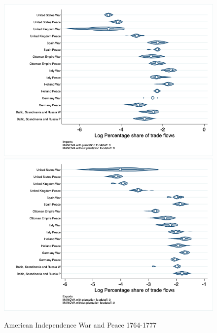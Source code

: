 \documentclass[12pt,a4paper,notitlepage,english]{article}
\begin{document}
\begin{appendix}
\begin{figure}[h!]
\centering
\caption{American Independence War and Peace 1764-1777}
\label{peace1764_1777_indep_nat_distr_pays7}
\includegraphics[scale=.4]{peace1764_1777_indep_nat_distr_Ipays7}
\includegraphics[scale=.4]{peace1764_1777_indep_nat_distr_Xpays7}
\end{figure}


\end{appendix}
\end{document}
